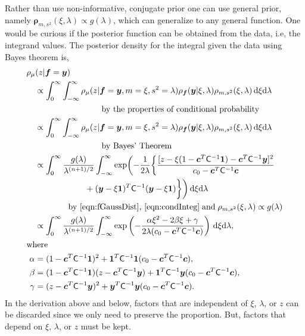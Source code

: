 \documentclass{iitthesis}          %
\newcommand{\bm}[1]{\boldsymbol{#1}}
\newcommand{\D}[1]{\text{d}{#1}}
\newcommand{\vc}{\bm{c}}
\newcommand{\vf}{\bm{f}}
\newcommand{\vrho}{\bm{\rho}}
\newcommand{\vy}{\bm{y}}
\newcommand{\vone}{\bm{1}}
\newcommand{\mC}{\mathsf{C}}
\begin{document}
Rather than use non-informative, conjugate prior one can use general prior, namely $\vrho_{m,s^2}(\xi, \lambda) \propto g(\lambda)$, which can generalize to any general function. One would be curious if the posterior function can be obtained from the data, i.e, the integrand values.
The posterior density for the integral given the data using Bayes theorem is,
\begin{align*}
\MoveEqLeft[1]{\rho_{\mu}(z | \vf = \vy)} \\
& \propto \int_{0}^\infty \int_{-\infty}^\infty \rho_{\mu}(z | \vf = \vy, m = \xi, s^2 = \lambda)  \rho_{\vf}(\vy | \xi, \lambda ) \rho_{m, s^2}(\xi, \lambda) \, \D \xi \D \lambda \\
&\qquad \qquad \qquad \qquad \text{by the properties of conditional probability} 
\\
& \propto \int_{0}^\infty \int_{-\infty}^\infty \rho_{\mu}(z | \vf = \vy, m = \xi, s^2 = \lambda)  \rho_{\vf}(\vy | \xi, \lambda ) \rho_{m, s^2}(\xi, \lambda) \, \D \xi \D \lambda \\
&\qquad \qquad \qquad \qquad \text{by Bayes' Theorem} 
\\
& \propto \displaystyle \int_{0}^\infty  \frac{g(\lambda)}{\lambda^{(n+1)/2}} 
\int_{-\infty}^\infty  \exp \biggl( -\frac{1}{2\lambda}\biggl\{
\frac{
	[z - \xi (1 - \vc^T \mC^{-1} \vone)  -  \vc^T \mC^{-1} \vy]^2}
{c_0  -\vc ^T \mC^{-1} \vc}  \\
& \qquad \qquad \qquad  + (\vy - \xi \vone)^T \mC^{-1}(\vy - \xi \vone) \biggr \} \biggr) \, \D \xi \D \lambda \\
&\qquad \qquad
\text{by \eqref{eqn:fGaussDist}, \eqref{eqn:condInteg}} \; \text{and} \; \rho_{m,s^2}(\xi,\lambda) \propto g(\lambda) \\
& \propto \displaystyle \int_{0}^\infty  \frac{g(\lambda)}{\lambda^{(n+1)/2}} \int_{-\infty}^\infty  \exp\left( -\frac{\alpha \xi^2 -2 \beta \xi + \gamma}{2\lambda(c_0  -\vc ^T \mC^{-1} \vc)} \right) \, \D \xi \D \lambda, \\
\intertext{where}
\alpha & = (1 - \vc^T \mC^{-1} \vone)^2 + \vone^T \mC^{-1} \vone (c_0  -\vc ^T \mC^{-1} \vc),\\
\beta & =(1 - \vc^T \mC^{-1} \vone)(z - \vc^T \mC^{-1} \vy )
+ \vone^T \mC^{-1} \vy (c_0  -\vc ^T \mC^{-1} \vc),\\
\gamma &  = (z - \vc^T \mC^{-1} \vy )^2  + \vy^T \mC^{-1} \vy (c_0  -\vc ^T \mC^{-1} \vc).
\end{align*}
In the derivation above and below, factors that are independent of $\xi$, $\lambda$, or $z$ can be discarded since we only need to preserve the proportion.  But, factors that depend on $\xi$, $\lambda$, or $z$ must be kept.  
\end{document}
